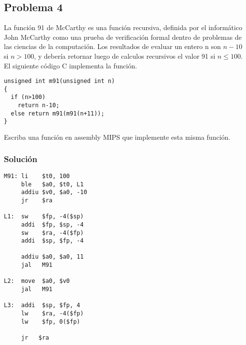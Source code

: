 \documentclass[letterpaper,11pt,notitlepage]{article}
\begin{document}
\newpage


\subsection*{Problema 4}

La función 91 de McCarthy es una función recursiva, definida por el informático John McCarthy como una prueba de verificación formal dentro de problemas de las ciencias de la computación. Los resultados de evaluar un entero n son $n-10$ si $n>100$, y debería retornar luego de calculos recursivos el valor 91 si $n\leq 100$. El siguiente código C implementa la función.

\begin{lstlisting}[style=C]
unsigned int m91(unsigned int n)
{
  if (n>100)
    return n-10;
  else return m91(m91(n+11));
}
\end{lstlisting}

Escriba una función en assembly MIPS que implemente esta misma función.

\subsubsection*{Solución}
\begin{lstlisting}[style=C]
M91: li    $t0, 100
	 ble   $a0, $t0, L1
	 addiu $v0, $a0, -10
	 jr    $ra
	 
L1:	 sw    $fp, -4($sp)
	 addi  $fp, $sp, -4
	 sw    $ra, -4($fp)
	 addi  $sp, $fp, -4

	 addiu $a0, $a0, 11
	 jal   M91

L2:	 move  $a0, $v0
	 jal   M91

L3:	 addi  $sp, $fp, 4
	 lw    $ra, -4($fp)
	 lw    $fp, 0($fp)

	 jr   $ra
\end{lstlisting}
\end{document}
